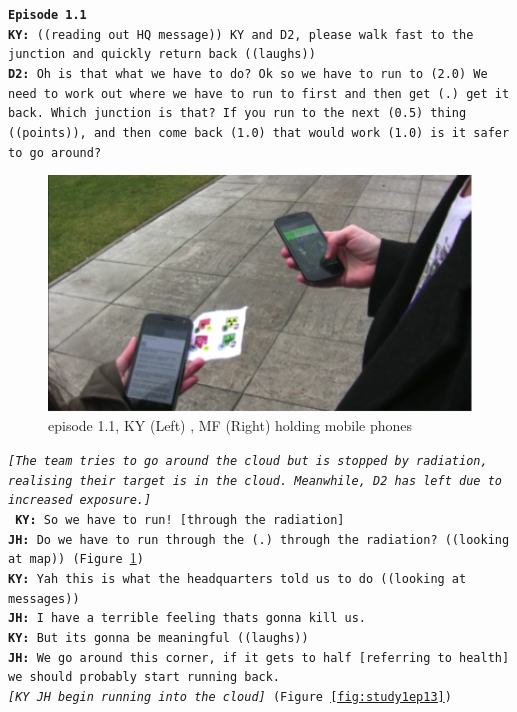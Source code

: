 \noindent \texttt{\textbf{Episode 1.1}\\
\textbf{KY:} ((reading out HQ message)) KY and D2, please walk fast to the junction and quickly return back ((laughs))\\
\textbf{D2:} Oh is that what we have to do? Ok so we have to run to (2.0) We need to work out where we have to run to first and then get (.) get it back. Which junction is that? If you run to the next (0.5) thing ((points)), and then come back (1.0) that would work (1.0) is it safer to go around?\\
}


\begin{figure}[h]
  \centering
  \includegraphics[width=1\textwidth]{img/study1/ep1/ep12}
  \caption{episode 1.1, KY (Left) , MF (Right) holding mobile phones}
  \label{fig:study1ep12}
\end{figure}


\noindent\texttt{\emph{[The team tries to go around the cloud but is stopped by radiation, realising their target is in the cloud. Meanwhile, D2 has left due to increased exposure.]\\}
\textbf{KY:} So we have to run! [through the radiation] \\
\textbf{JH:} Do we have to run through the (.) through the radiation? ((looking at map)) (Figure \ref{fig:study1ep12})\\
\textbf{KY:} Yah this is what the headquarters told us to do ((looking at messages)) \\
\textbf{JH:} I have a terrible feeling thats gonna kill us.\\
\textbf{KY:} But its gonna be meaningful ((laughs))\\
\textbf{JH:} We go around this corner, if it gets to half [referring to health] we should probably start running back.\\
\emph{ [KY JH begin running into the cloud] } (Figure \ref{fig:study1ep13})
}

